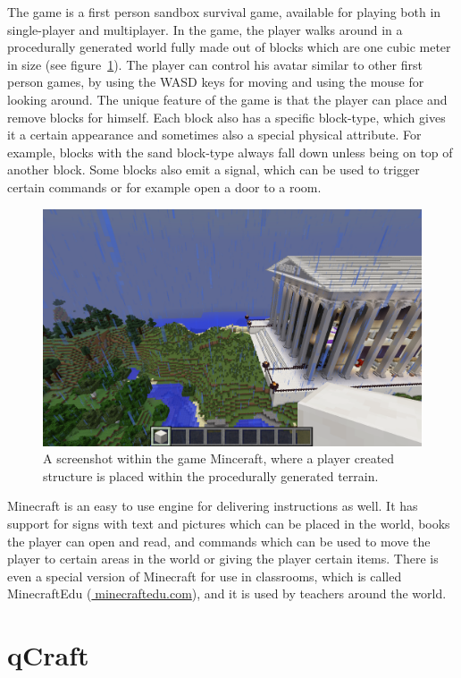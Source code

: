 \documentclass[11pt,twoside]{report} %
\begin{document}
The game is a first person sandbox survival game, available for playing both in single-player and multiplayer. In the game, the player walks around in a procedurally generated world fully made out of blocks which are one cubic meter in size (see figure~\ref{fig:screenshot}). The player can control his avatar similar to other first person games, by using the WASD keys for moving and using the mouse for looking around. The unique feature of the game is that the player can place and remove blocks for himself. Each block also has a specific block-type, which gives it a certain appearance and sometimes also a special physical attribute. For example, blocks with the sand block-type always fall down unless being on top of another block. Some blocks also emit a signal, which can be used to trigger certain commands or for example open a door to a room.

\begin{figure}[h]
\centering
\includegraphics[width=\textwidth]{screenshot}
\caption{A screenshot within the game Minceraft, where a player created structure is placed within the procedurally generated terrain.\label{fig:screenshot}}
\end{figure}

Minecraft is an easy to use engine for delivering instructions as well. It has support for signs with text and pictures which can be placed in the world, books the player can open and read, and commands which can be used to move the player to certain areas in the world or giving the player certain items. There is even a special version of Minecraft for use in classrooms, which is called MinecraftEdu (\url{minecraftedu.com}), and it is used by teachers around the world.

\section{qCraft}
\end{document}
